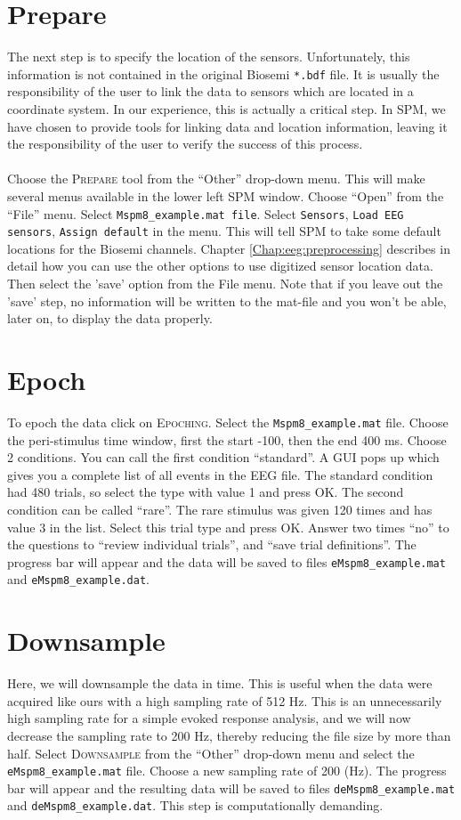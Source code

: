 \section{Prepare}
The next step is to specify the location of the sensors. Unfortunately, this information is not contained in the original Biosemi \texttt{*.bdf} file. It is usually the responsibility of the user to link the data to sensors which are located in a coordinate system. In our experience, this is actually a critical step. In SPM, we have chosen to provide tools for linking data and location information, leaving it the responsibility of the user to verify the success of this process.
\\
\\
Choose the \textsc{Prepare} tool from the ``Other'' drop-down menu. This will make several menus available in the lower left SPM window. Choose ``Open'' from the ``File'' menu. Select \texttt{Mspm8\_example.mat file}. Select \texttt{Sensors}, \texttt{Load EEG sensors}, \texttt{Assign default} in the menu. This will tell SPM to take some default locations for the Biosemi channels. Chapter \ref{Chap:eeg:preprocessing} describes in detail how you can use the other options to use digitized sensor location data. Then select the 'save' option from the File menu. Note that if you leave out the 'save' step, no information will be written to the mat-file and you won't be able, later on, to display the data properly.

\section{Epoch}
To epoch the data click on \textsc{Epoching}. Select the \texttt{Mspm8\_example.mat} file. Choose the peri-stimulus time window, first the start -100, then the end 400 ms. Choose 2 conditions. You can call the first condition ``standard''. A GUI pops up which gives you a complete list of all events in the EEG file. The standard condition had 480 trials, so select the type with value 1 and press OK. The second condition can be called ``rare''. The rare stimulus was given 120 times and has value 3 in the list. Select this trial type and press OK. Answer two times ``no'' to the questions to ``review individual trials'', and ``save trial definitions''. The progress bar will appear and the data will be saved to files \texttt{eMspm8\_example.mat} and \texttt{eMspm8\_example.dat}.

\section{Downsample}
Here, we will downsample the data in time. This is useful when the data were acquired like ours with a high sampling rate of 512 Hz. This is an unnecessarily high sampling rate for a simple evoked response analysis, and we will now decrease the sampling rate to 200 Hz, thereby reducing the file size by more than half. Select \textsc{Downsample} from the ``Other'' drop-down menu and select the \texttt{eMspm8\_example.mat} file. Choose a new sampling rate of 200 (Hz). The progress bar will appear and the resulting data will be saved to files \texttt{deMspm8\_example.mat} and \texttt{deMspm8\_example.dat}. This step is computationally demanding.

